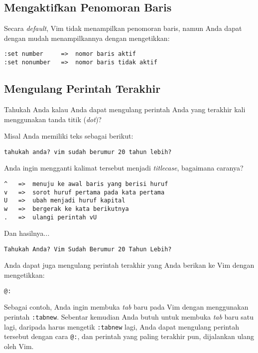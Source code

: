 \documentclass{article}
\begin{document}
\subsection{Mengaktifkan Penomoran Baris}
Secara \emph{default}, Vim tidak menampilkan penomoran
baris, namun Anda dapat dengan mudah menampilkannya dengan
mengetikkan:

\begin{verbatim}
:set number     =>  nomor baris aktif
:set nonumber   =>  nomor baris tidak aktif 
\end{verbatim}

\subsection{Mengulang Perintah Terakhir}

Tahukah Anda kalau Anda dapat mengulang perintah Anda yang
terakhir kali menggunakan tanda titik (\emph{dot})?

Misal Anda memiliki teks sebagai berikut:

\begin{verbatim}
tahukah anda? vim sudah berumur 20 tahun lebih?
\end{verbatim}

Anda ingin mengganti kalimat tersebut menjadi
\emph{titlecase}, bagaimana caranya?

\begin{verbatim}
^   =>  menuju ke awal baris yang berisi huruf
v   =>  sorot huruf pertama pada kata pertama
U   =>  ubah menjadi huruf kapital
w   =>  bergerak ke kata berikutnya
.   =>  ulangi perintah vU
\end{verbatim}

Dan hasilnya...

\begin{verbatim}
Tahukah Anda? Vim Sudah Berumur 20 Tahun Lebih?
\end{verbatim}

Anda dapat juga mengulang perintah terakhir yang Anda
berikan ke Vim dengan mengetikkan:

\begin{verbatim}
@:
\end{verbatim}

Sebagai contoh, Anda ingin membuka \emph{tab} baru pada Vim
dengan menggunakan perintah \verb=:tabnew=. Sebentar
kemudian Anda butuh untuk membuka \emph{tab} baru satu lagi,
daripada harus mengetik \verb=:tabnew= lagi, Anda dapat
mengulang perintah tersebut dengan cara \verb=@:=, dan
perintah yang paling terakhir pun, dijalankan ulang oleh
Vim.
\end{document}
